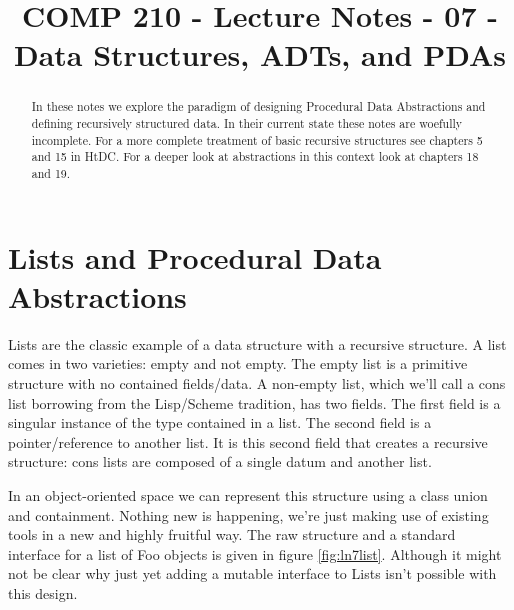 \documentclass[]{tufte-handout}
\title{COMP 210 - Lecture Notes - 07 - Data Structures, ADTs, and PDAs}
\begin{document}
\maketitle

\begin{abstract}
In these notes we explore the paradigm of designing Procedural Data Abstractions and defining recursively structured data.  In their current state these notes are woefully incomplete. For a more complete treatment of basic recursive structures see chapters 5 and 15 in HtDC\cite{htdc}. For a deeper look at abstractions in this context look at chapters 18 and 19. 
\end{abstract}

\section{Lists and Procedural Data Abstractions}

Lists are the classic example of a data structure with a recursive structure. A list comes in two varieties: empty and not empty. The empty list is a primitive structure with no contained fields/data. A non-empty list, which we'll call a cons list borrowing from the Lisp/Scheme tradition, has two fields. The first field is a singular instance of the type contained in a list. The second field is a pointer/reference to another list.  It is this second field that creates a recursive structure: cons lists are composed of a single datum and another list. 

In an object-oriented space we can represent this structure using a class union and containment. Nothing new is happening, we're just making use of existing tools in a new and highly fruitful way. The raw structure and a standard interface for a list of Foo objects is given in figure \ref{fig:ln7list}. Although it might not be clear why just yet adding a mutable interface to Lists isn't possible with this design. 
\end{document}
